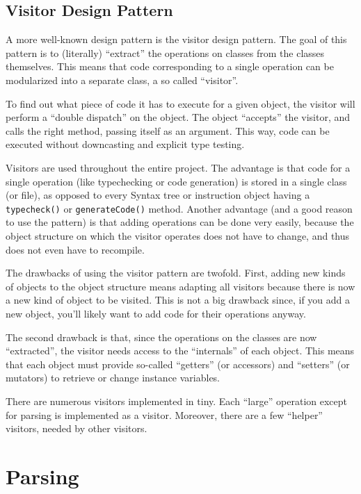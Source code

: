 \documentclass[a4paper]{article}
\begin{document}
\subsection{Visitor Design Pattern}

A more well-known design pattern is the visitor design pattern. The goal of
this pattern is to (literally) ``extract'' the operations on classes from the
classes themselves. This means that code corresponding to a single operation
can be modularized into a separate class, a so called ``visitor''.

To find out what piece of code it has to execute for a given object, the
visitor will perform a ``double dispatch'' on the object. The object
``accepts'' the visitor, and calls the right method, passing itself as an
argument. This way, code can be executed without downcasting and explicit type
testing.

Visitors are used throughout the entire project. The advantage is that code
for a single operation (like typechecking or code generation) is stored in a
single class (or file), as opposed to every Syntax tree or instruction object
having a \texttt{typecheck()} or \texttt{generateCode()} method. Another
advantage (and a good reason to use the pattern) is that adding operations can
be done very easily, because the object structure on which the visitor
operates does not have to change, and thus does not even have to recompile.

The drawbacks of using the visitor pattern are twofold. First, adding new
kinds of objects to the object structure means adapting all visitors because
there is now a new kind of object to be visited. This is not a big drawback
since, if you add a new object, you'll likely want to add code for their
operations anyway.

The second drawback is that, since the operations on the classes are now
``extracted'', the visitor needs access to the ``internals'' of each object.
This means that each object must provide so-called ``getters'' (or accessors)
and ``setters'' (or mutators) to retrieve or change instance variables.

There are numerous visitors implemented in tiny. Each ``large'' operation
except for parsing is implemented as a visitor. Moreover, there are a few
``helper'' visitors, needed by other visitors.

\section{Parsing}
\end{document}
